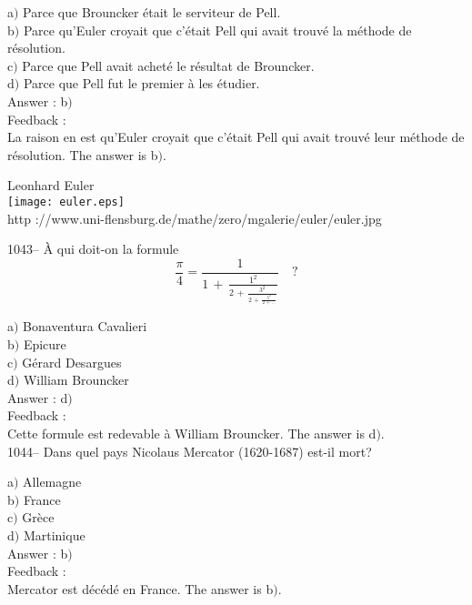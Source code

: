 ﻿\documentclass[letterpaper, 12pt]{article}
\begin{document}
a$)$ Parce que Brouncker \'etait le serviteur de Pell. \\
b$)$ Parce qu'Euler croyait que c'\'etait Pell qui avait trouv\'e la
m\'ethode de r\'esolution.  \\
c$)$ Parce que Pell avait achet\'e le r\'esultat de Brouncker.  \\
d$)$ Parce que Pell fut le premier \`a les \'etudier.\\

Answer : b$)$\\

Feedback : \\
La raison en est qu'Euler croyait que c'\'etait Pell qui avait
trouv\'e leur m\'ethode de r\'esolution.
The answer is b$)$.\\
        \begin{center}
        Leonhard Euler\\
    \texttt{[image: euler.eps]}\\
        {\footnotesize http
://www.uni-flensburg.de/mathe/zero/mgalerie/euler/euler.jpg}
    \end{center}

1043-- \`A qui doit-on la formule
$$\displaystyle{\frac{\pi}4=\frac1{1\,+\,\frac{1^2}{2\,+\,\frac{3^2}{2\,+\,\frac{5^2}{2\,+\,\ldots}}}}}\quad?$$

a$)$ Bonaventura Cavalieri \\
b$)$ Epicure \\
c$)$ G\'erard Desargues  \\
d$)$ William Brouncker\\

Answer : d$)$\\

Feedback : \\
Cette formule est redevable \`a William Brouncker.
The answer is d$)$.\\

1044-- Dans quel pays Nicolaus Mercator (1620-1687) est-il mort?

a$)$ Allemagne \\
b$)$ France  \\
c$)$ Gr\`ece  \\
d$)$ Martinique \\

Answer : b$)$\\

Feedback : \\
Mercator est d\'ec\'ed\'e en France.
The answer is b$)$.\\
\end{document}
